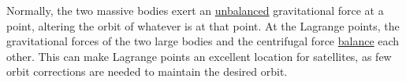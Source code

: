 Normally, the two massive bodies exert an \underline{unbalanced} gravitational force at a point, altering the orbit of whatever is at that point. At the Lagrange points, the gravitational forces of the two large bodies and the centrifugal force \underline{balance} each other. This can make Lagrange points an excellent location for satellites, as few orbit corrections are needed to maintain the desired orbit. 